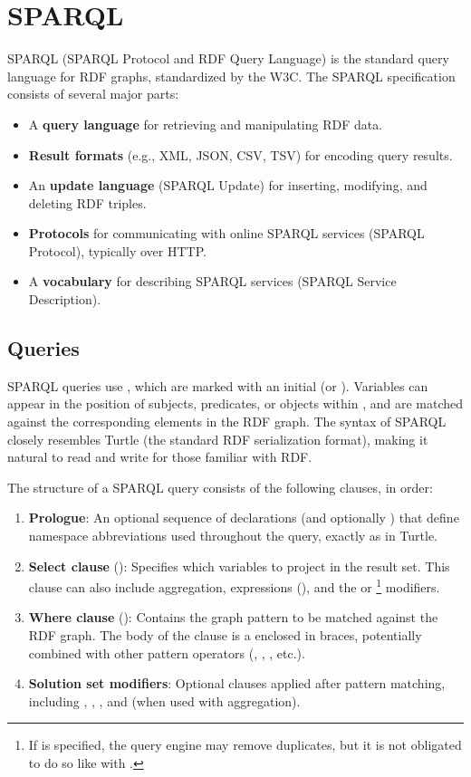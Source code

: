 \section{SPARQL}
SPARQL (SPARQL Protocol and RDF Query Language) is the standard query language for RDF graphs, standardized by the W3C. The SPARQL specification consists of several major parts:
\begin{itemize}
    \item A \textbf{query language} for retrieving and manipulating RDF data.
    \item \textbf{Result formats} (e.g., XML, JSON, CSV, TSV) for encoding query results.
    \item An \textbf{update language} (SPARQL Update) for inserting, modifying, and deleting RDF triples.
    \item \textbf{Protocols} for communicating with online SPARQL services (SPARQL Protocol), typically over HTTP.
    \item A \textbf{vocabulary} for describing SPARQL services (SPARQL Service Description).
\end{itemize}

\subsection{Queries}
SPARQL queries use , which are marked with an initial  (or \code{\$}). Variables can appear in the position of subjects, predicates, or objects within , and are matched against the corresponding elements in the RDF graph. The syntax of SPARQL closely resembles Turtle (the standard RDF serialization format), making it natural to read and write for those familiar with RDF.

The structure of a SPARQL  query consists of the following clauses, in order:
\begin{enumerate}
    \item \textbf{Prologue}: An optional sequence of  declarations (and optionally ) that define namespace abbreviations used throughout the query, exactly as in Turtle.
    \item \textbf{Select clause} (): Specifies which variables to project in the result set. This clause can also include aggregation, expressions (), and the  or \footnote{If  is specified, the query engine may remove duplicates, but it is not obligated to do so like with .} modifiers.
    \item \textbf{Where clause} (): Contains the graph pattern to be matched against the RDF graph. The body of the  clause is a  enclosed in braces, potentially combined with other pattern operators (, , , etc.).
    \item \textbf{Solution set modifiers}: Optional clauses applied after pattern matching, including , , , and  (when used with aggregation).
\end{enumerate}

